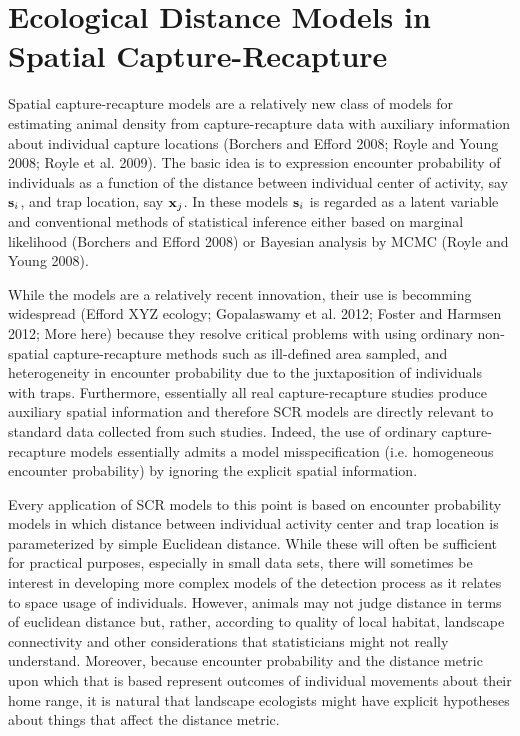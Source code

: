 \chapter{
Ecological Distance Models in Spatial Capture-Recapture
}
\label{chapt.implicit}


\vspace{.3in}


Spatial capture-recapture models are a relatively new class of models 
for estimating animal density from capture-recapture data with auxiliary 
information about individual capture locations
(Borchers and Efford 2008; Royle and Young 2008; Royle et al. 2009). 
The basic idea is to expression encounter probability of individuals 
as a function of the distance between individual center of activity, 
say ${\bf s}_{i}$, and trap location, say ${\bf x}_{j}$.
In these models ${\bf s}_{i}$ is regarded as a latent variable and 
conventional methods of statistical inference either based on 
marginal likelihood (Borchers and Efford 2008) or Bayesian analysis by 
MCMC (Royle and Young 2008).

While the models are a relatively recent innovation, their use is 
becomming widespread (Efford XYZ ecology; Gopalaswamy et al. 2012; Foster and Harmsen
2012; More here) 
because they resolve critical problems with using 
ordinary non-spatial capture-recapture methods such as ill-defined area 
sampled, and heterogeneity in encounter probability due to the 
juxtaposition of individuals with traps. Furthermore, essentially all real 
capture-recapture studies produce auxiliary spatial information and therefore
SCR models are directly relevant to standard data collected from such 
studies. Indeed, the use of ordinary capture-recapture models essentially 
admits a model misspecification (i.e. homogeneous encounter probability) 
by ignoring the explicit spatial information.

Every application of SCR models to this point is based on encounter 
probability models in which distance between individual activity center 
and trap location is parameterized by simple Euclidean distance.
While these will often be sufficient for practical purposes, especially in 
small data sets, there will sometimes be interest in developing more 
complex models of the detection process as it relates to space usage of 
individuals.  
However, animals may not
judge distance in terms of euclidean distance but, rather, according
to quality of local habitat, landscape connectivity and other considerations that statisticians
might not really understand. Moreover, because encounter probability and the
distance metric upon which that is based represent outcomes of individual movements about their
home range, it is natural that 
landscape ecologists might have explicit
hypotheses about things that affect the distance metric. 

